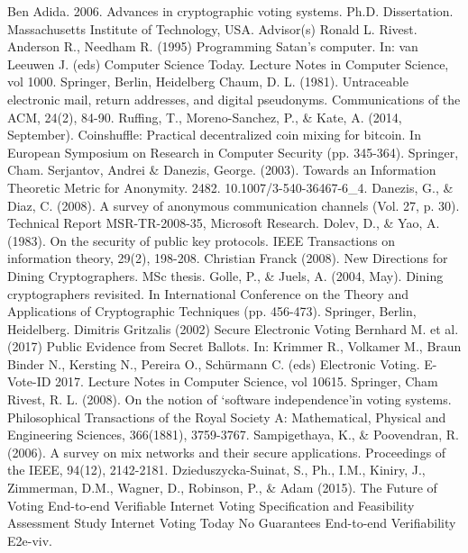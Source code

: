 \begin{thebibliography}{9}
  
 Ben Adida. 2006. Advances in cryptographic voting systems. Ph.D. Dissertation. Massachusetts Institute of Technology, USA. Advisor(s) Ronald L. Rivest.
 Anderson R., Needham R. (1995) Programming Satan's computer. In: van Leeuwen J. (eds) Computer Science Today. Lecture Notes in Computer Science, vol 1000. Springer, Berlin, Heidelberg
 Chaum, D. L. (1981). Untraceable electronic mail, return addresses, and digital pseudonyms. Communications of the ACM, 24(2), 84-90.
 Ruffing, T., Moreno-Sanchez, P., \& Kate, A. (2014, September). Coinshuffle: Practical decentralized coin mixing for bitcoin. In European Symposium on Research in Computer Security (pp. 345-364). Springer, Cham.
 Serjantov, Andrei \& Danezis, George. (2003). Towards an Information Theoretic Metric for Anonymity. 2482. 10.1007/3-540-36467-6\_4.
 Danezis, G., \& Diaz, C. (2008). A survey of anonymous communication channels (Vol. 27, p. 30). Technical Report MSR-TR-2008-35, Microsoft Research.
 Dolev, D., \& Yao, A. (1983). On the security of public key protocols. IEEE Transactions on information theory, 29(2), 198-208.
 Christian Franck (2008). New Directions for Dining Cryptographers. MSc thesis.
 Golle, P., \& Juels, A. (2004, May). Dining cryptographers revisited. In International Conference on the Theory and Applications of Cryptographic Techniques (pp. 456-473). Springer, Berlin, Heidelberg.
 Dimitris Gritzalis (2002) Secure Electronic Voting
 Bernhard M. et al. (2017) Public Evidence from Secret Ballots. In: Krimmer R., Volkamer M., Braun Binder N., Kersting N., Pereira O., Schürmann C. (eds) Electronic Voting. E-Vote-ID 2017. Lecture Notes in Computer Science, vol 10615. Springer, Cham 
 Rivest, R. L. (2008). On the notion of ‘software independence’in voting systems. Philosophical Transactions of the Royal Society A: Mathematical, Physical and Engineering Sciences, 366(1881), 3759-3767.
 Sampigethaya, K., \& Poovendran, R. (2006). A survey on mix networks and their secure applications. Proceedings of the IEEE, 94(12), 2142-2181.
 Dzieduszycka-Suinat, S., Ph., I.M., Kiniry, J., Zimmerman, D.M., Wagner, D., Robinson, P., \& Adam (2015). The Future of Voting End-to-end Verifiable Internet Voting Specification and Feasibility Assessment Study Internet Voting Today No Guarantees End-to-end Verifiability E2e-viv.

  
\end{thebibliography}